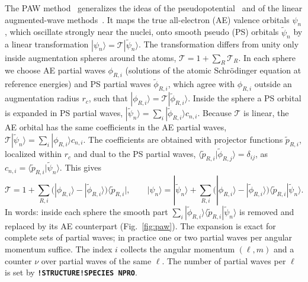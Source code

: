 \documentclass[11pt,a4paper,oneside]{book}
\newcommand{\key}[1]{\textbf{\texttt{#1}}}
\newcommand{\bra}[1]{\langle #1|}
\newcommand{\ket}[1]{|#1\rangle}
\newcommand{\braket}[2]{\langle #1|#2\rangle}
\newcommand{\pt}{\tilde p}
\begin{document}
The PAW method~\cite{bloechl94_prb50_17953} generalizes the ideas of the
pseudopotential~\cite{hamann79_prl43_1494} and of the linear
augmented-wave methods~\cite{anderson75_prb12_3060}. It maps the true
all-electron (AE) valence orbitals $\psi_n$, which oscillate strongly
near the nuclei, onto smooth pseudo (PS) orbitals $\tilde\psi_n$ by a
linear transformation $\ket{\psi_n}=\mathcal T\ket{\tilde\psi_n}$. The
transformation differs from unity only inside augmentation spheres
around the atoms, $\mathcal T=1+\sum_R\mathcal T_R$. In each sphere
we choose AE partial waves $\phi_{R,i}$ (solutions of the atomic
Schr\"odinger equation at reference energies) and PS partial waves
$\tilde\phi_{R,i}$, which agree with $\phi_{R,i}$ outside an augmentation
radius $r_c$, such that $\ket{\phi_{R,i}}=\mathcal T\ket{\tilde\phi_{R,i}}$.
Inside the sphere a PS orbital is expanded in PS partial waves,
$\ket{\tilde\psi_n}=\sum_i\ket{\tilde\phi_{R,i}}c_{n,i}$. Because $\mathcal T$
is linear, the AE orbital has the same coefficients in the AE partial
waves, $\mathcal T\ket{\tilde\psi_n}=\sum_i\ket{\phi_{R,i}}c_{n,i}$. The
coefficients are obtained with projector functions $\pt_{R,i}$, localized
within $r_c$ and dual to the PS partial waves,
$\braket{\pt_{R,i}}{\tilde\phi_{R,j}}=\delta_{ij}$, as
$c_{n,i}=\braket{\pt_{R,i}}{\tilde\psi_n}$. This gives
\begin{equation}
  \mathcal T=1+\sum_{R,i}\bigl(\ket{\phi_{R,i}}-\ket{\tilde\phi_{R,i}}\bigr)\bra{\pt_{R,i}},
  \qquad
  \ket{\psi_n}=\ket{\tilde\psi_n}
  +\sum_{R,i}\bigl(\ket{\phi_{R,i}}-\ket{\tilde\phi_{R,i}}\bigr)
  \braket{\pt_{R,i}}{\tilde\psi_n}.
  \label{eq:pawtrafo}
\end{equation}
In words: inside each sphere the smooth part
$\sum_i\ket{\tilde\phi_{R,i}}\braket{\pt_{R,i}}{\tilde\psi_n}$ is removed and
replaced by its AE counterpart (Fig.~\ref{fig:paw}). The expansion is exact for complete sets
of partial waves; in practice one or two partial waves per angular
momentum suffice. The index $i$ collects the angular momentum $(\ell,m)$
and a counter $\nu$ over partial waves of the same $\ell$. The number of
partial waves per $\ell$ is set by \key{!STRUCTURE!SPECIES NPRO}.
\end{document}
